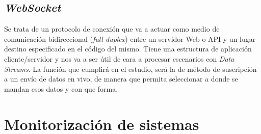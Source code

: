 \subsection{\textit{WebSocket}}
Se trata de un protocolo de conexión que va a actuar como medio de comunicación bidireccional (\textit{full-duplex}) entre un servidor Web o API y un lugar destino especificado en el código del mismo\cite{WebSocket}. Tiene una estructura de aplicación cliente/servidor y nos va a ser útil de cara a procesar escenarios con \textit{Data Streams}. La función que cumplirá en el estudio, será la de método de suscripción a un envío de datos en vivo, de manera que permita seleccionar a donde se mandan esos datos y con que forma.

\paragraph{  }
\paragraph{  }
\paragraph{  }
\paragraph{  }
\paragraph{  }
\paragraph{  }
\paragraph{  }
\paragraph{  }
\paragraph{  }



\section{Monitorización de sistemas}


